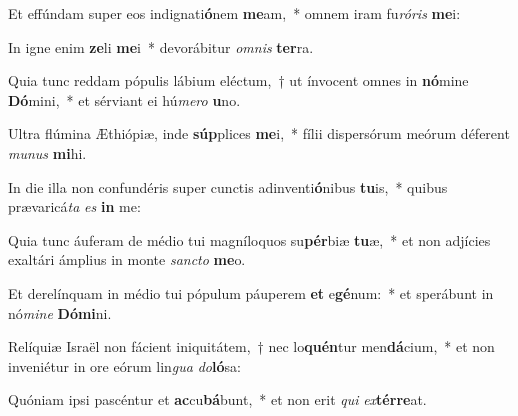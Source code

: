 \item Et effúndam super eos indignati\textbf{ó}nem \textbf{me}am,~* omnem iram fu\textit{ró}\textit{ris} \textbf{me}i:
\item In igne enim \textbf{ze}li \textbf{me}i~* devorábitur \textit{om}\textit{nis} \textbf{ter}ra.
\item Quia tunc reddam pópulis lábium eléctum,~† ut ínvocent omnes in \textbf{nó}mine \textbf{Dó}mini,~* et sérviant ei hú\textit{me}\textit{ro} \textbf{u}no.
\item Ultra flúmina Æthiópiæ, inde \textbf{súp}plices \textbf{me}i,~* fílii dispersórum meórum déferent \textit{mu}\textit{nus} \textbf{mi}hi.
\item In die illa non confundéris super cunctis adinventi\textbf{ó}nibus \textbf{tu}is,~* quibus prævaricá\textit{ta} \textit{es} \textbf{in} me:
\item Quia tunc áuferam de médio tui magníloquos su\textbf{pér}biæ \textbf{tu}æ,~* et non adjícies exaltári ámplius in monte \textit{sanc}\textit{to} \textbf{me}o.
\item Et derelínquam in médio tui pópulum páuperem \textbf{et} e\textbf{gé}num:~* et sperábunt in nó\textit{mi}\textit{ne} \textbf{Dó}\textbf{mi}ni.
\item Relíquiæ Israël non fácient iniquitátem,~† nec lo\textbf{quén}tur men\textbf{dá}cium,~* et non inveniétur in ore eórum lin\textit{gua} \textit{do}\textbf{ló}sa:
\item Quóniam ipsi pascéntur et \textbf{ac}cu\textbf{bá}bunt,~* et non erit \textit{qui} \textit{ex}\textbf{tér}\textbf{re}at.
